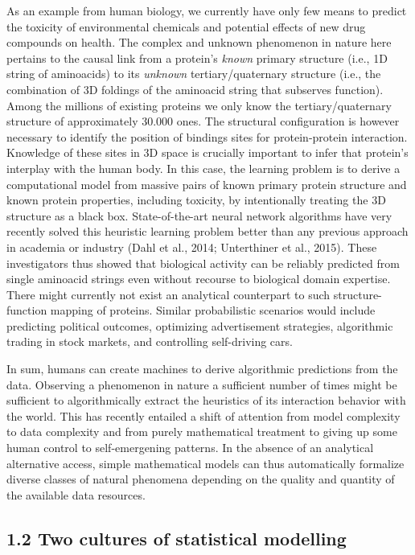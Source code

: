\documentclass[authoryear,review,3p]{elsarticle}
\begin{document}
As an example from human biology,
we currently have only few means to predict the
toxicity of environmental chemicals and
potential effects of new drug compounds on health.
%
The complex and unknown phenomenon in nature here pertains
to the causal link from
a protein's \textit{known} primary structure
(i.e., 1D string of aminoacids)
to
its \textit{unknown} tertiary/quaternary structure
(i.e., the combination of 3D foldings
of the aminoacid string that subserves function).
%
Among the millions of existing proteins
we only know the tertiary/quaternary structure of
approximately 30.000 ones.
The structural configuration is however necessary to identify the position of
bindings sites for protein-protein interaction.
Knowledge of these sites in 3D space is crucially important
to infer that protein's interplay with the human body.
%
In this case,
the learning problem is to
derive a computational model from
massive pairs of known primary protein structure and
known protein properties, including toxicity,
by intentionally treating the 3D structure
as a black box.
%
State-of-the-art neural network algorithms
have very recently solved this heuristic learning problem
better than any previous approach in academia or industry
(Dahl et al., 2014; Unterthiner et al., 2015).
These investigators thus showed that biological activity
can be reliably predicted from single aminoacid strings
even without recourse to biological domain expertise.
%
There might currently not exist
an analytical counterpart to such
structure-function mapping of proteins.
%
%
Similar probabilistic scenarios would include predicting
political outcomes,
optimizing advertisement strategies,
algorithmic trading in stock markets, and
controlling self-driving cars.


In sum,
humans can create machines to derive
algorithmic predictions from the data.
Observing a phenomenon in nature a sufficient number of times
might be sufficient to
algorithmically extract
the heuristics of its interaction behavior with the world.
This has recently entailed a shift
of attention
from model complexity to data complexity
and
from purely mathematical treatment to giving up some
human control to self-emergening patterns.
In the absence of an analytical alternative access,
simple mathematical models can thus automatically
formalize diverse classes of natural phenomena
depending on the quality and quantity of
the available data resources.



\subsection*{1.2 Two cultures of statistical modelling}
\end{document}
